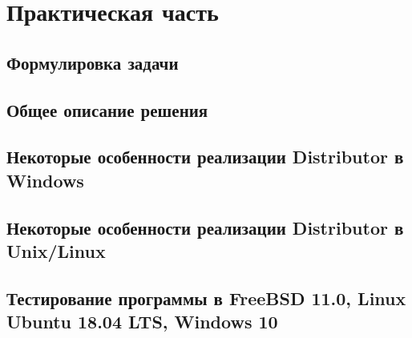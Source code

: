 \newpage
\section[Практическая часть]{Практическая часть}

\subsection{Формулировка задачи}



\subsection{Общее описание решения}


\subsection{Некоторые особенности реализации Distributor в Windows}


\subsection{Некоторые особенности реализации Distributor в Unix/Linux}


\subsection{Тестирование программы в FreeBSD 11.0, Linux Ubuntu 18.04 LTS, Windows 10}
